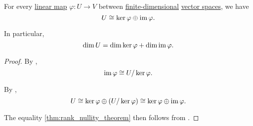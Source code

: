 \begin{theorem}\label{thm:rank_nullity_theorem}
  For every \hyperref[def:linear_function]{linear map} \( \varphi: U \to V \) between \hyperref[thm:vector_space_dimension]{finite-dimensional} \hyperref[def:vector_space]{vector spaces}, we have
  \begin{equation}\label{eq:thm:rank_nullity_theorem}
    U \cong \ker \varphi \oplus \operatorname{im} \varphi.
  \end{equation}

  In particular,
  \begin{equation}\label{eq:thm:rank_nullity_theorem/dim}
    \dim U = \dim \ker \varphi + \dim \operatorname{im} \varphi.
  \end{equation}
\end{theorem}
\begin{proof}
  By ,
  \begin{equation*}
    \operatorname{im} \varphi \cong U / \ker \varphi.
  \end{equation*}

  By ,
  \begin{equation*}
    U \cong \ker \varphi \oplus (U / \ker \varphi) \cong \ker \varphi \oplus \operatorname{im} \varphi.
  \end{equation*}

  The equality \eqref{thm:rank_nullity_theorem} then follows from .
\end{proof}
